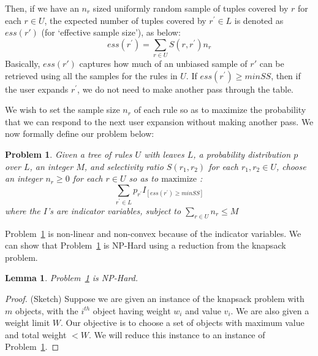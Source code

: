 \documentclass[10pt,journal,compsoc]{IEEEtran}
\newtheorem{lemma}{Lemma}
\newcounter{prob}
\newtheorem{problem}[prob]{Problem}
\begin{document}
{Then, if we have an $n_r$ sized uniformly random sample of tuples covered by $r$ for each $r \in U$, the expected number of tuples covered by $r^{\prime} \in L$ is denoted as $ess(r')$ (for `effective sample size'), as below: 
\begin{equation} \label{def:ess}
ess(r^{\prime}) = \sum_{r \in U} S(r, r^{\prime})n_r
\end{equation}
Basically, $ess(r')$ captures how much of an unbiased sample of $r'$ can be retrieved using all the samples for the rules in $U$.
If $ess(r^{\prime}) \geq minSS$, then if the user expands $r^{\prime}$, we do not need to make another 
pass through the table.

We wish to set the sample size $n_r$ of each rule so as to maximize the probability that we can respond to the next user expansion without making another pass. We now formally define our problem below:
\begin{problem}\label{prob:sample-sizes}
Given a tree of rules $U$ with leaves $L$, a probability distribution $p$ over $L$, an integer $M$, and selectivity ratio $S(r_1, r_2)$ for each $r_1, r_2 \in U$, 
choose an integer $n_r \geq 0$ for each $r \in U$ so as to $\textrm{maximize}$ :
$$\sum_{r^{\prime} \in L} p_{r^{\prime}}I_{[ess(r^{\prime}) \geq minSS]}$$
where the $I$'s are indicator variables, subject to
$\sum_{r \in U} n_r \leq M$
\end{problem}
Problem~\ref{prob:sample-sizes} is non-linear and non-convex because of the indicator variables. 
We can show that Problem~\ref{prob:sample-sizes} is {\sc NP-Hard} using a reduction from the knapsack problem. 
\begin{lemma}\label{lemma:sampling-hardness}
Problem~\ref{prob:sample-sizes} is {\sc NP-Hard}.
\end{lemma}
\begin{proof}(Sketch)
Suppose we are given an instance of the knapsack problem with $m$ objects, with the $i^{th}$ object having weight $w_i$ and value $v_i$. We are also given a weight limit $W$. Our objective is to choose a set of objects with maximum value and total weight $< W$. We will reduce this instance to an instance of Problem~\ref{prob:sample-sizes}.


\end{proof}}
\end{document}
